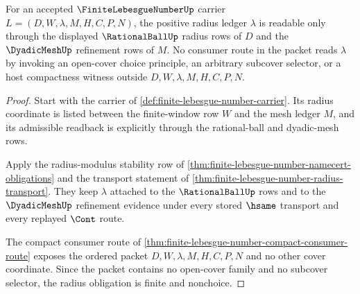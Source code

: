 \begin{theorem}
\label{thm:finite-lebesgue-number-finite-radius-nonchoice}
For an accepted $\FiniteLebesgueNumberUp$ carrier $L=(D,W,\lambda,M,H,C,P,N)$, the positive radius ledger $\lambda$ is readable only through the displayed $\RationalBallUp$ radius rows of $D$ and the $\DyadicMeshUp$ refinement rows of $M$. No consumer route in the packet reads $\lambda$ by invoking an open-cover choice principle, an arbitrary subcover selector, or a host compactness witness outside $D,W,\lambda,M,H,C,P,N$.
\end{theorem}
\begin{proof}
Start with the carrier of \autoref{def:finite-lebesgue-number-carrier}. Its radius coordinate is listed between the finite-window row $W$ and the mesh ledger $M$, and its admissible readback is explicitly through the rational-ball and dyadic-mesh rows.

Apply the radius-modulus stability row of \autoref{thm:finite-lebesgue-number-namecert-obligations} and the transport statement of \autoref{thm:finite-lebesgue-number-radius-transport}. They keep $\lambda$ attached to the $\RationalBallUp$ rows and to the $\DyadicMeshUp$ refinement evidence under every stored $\hsame$ transport and every replayed $\Cont$ route.

The compact consumer route of \autoref{thm:finite-lebesgue-number-compact-consumer-route} exposes the ordered packet $D,W,\lambda,M,H,C,P,N$ and no other cover coordinate. Since the packet contains no open-cover family and no subcover selector, the radius obligation is finite and nonchoice.
\end{proof}

